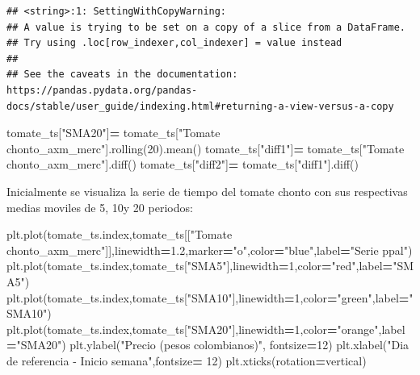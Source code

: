 \documentclass[
]{book}
\newenvironment{Shaded}{\begin{snugshade}}{\end{snugshade}}
\newcommand{\DecValTok}[1]{\textcolor[rgb]{0.00,0.00,0.81}{#1}}
\newcommand{\FloatTok}[1]{\textcolor[rgb]{0.00,0.00,0.81}{#1}}
\newcommand{\NormalTok}[1]{#1}
\newcommand{\OperatorTok}[1]{\textcolor[rgb]{0.81,0.36,0.00}{\textbf{#1}}}
\newcommand{\StringTok}[1]{\textcolor[rgb]{0.31,0.60,0.02}{#1}}
\begin{document}
\begin{verbatim}
## <string>:1: SettingWithCopyWarning: 
## A value is trying to be set on a copy of a slice from a DataFrame.
## Try using .loc[row_indexer,col_indexer] = value instead
## 
## See the caveats in the documentation: https://pandas.pydata.org/pandas-docs/stable/user_guide/indexing.html#returning-a-view-versus-a-copy
\end{verbatim}

\begin{Shaded}
\begin{Highlighting}[]
\NormalTok{tomate\_ts[}\StringTok{"SMA20"}\NormalTok{]}\OperatorTok{=}\NormalTok{ tomate\_ts[}\StringTok{"Tomate chonto\_axm\_merc"}\NormalTok{].rolling(}\DecValTok{20}\NormalTok{).mean()}
\NormalTok{tomate\_ts[}\StringTok{"diff1"}\NormalTok{]}\OperatorTok{=}\NormalTok{ tomate\_ts[}\StringTok{"Tomate chonto\_axm\_merc"}\NormalTok{].diff()}
\NormalTok{tomate\_ts[}\StringTok{"diff2"}\NormalTok{]}\OperatorTok{=}\NormalTok{ tomate\_ts[}\StringTok{"diff1"}\NormalTok{].diff()}
\end{Highlighting}
\end{Shaded}

Inicialmente se visualiza la serie de tiempo del tomate chonto con sus respectivas medias moviles de 5, 10y 20 periodos:

\begin{Shaded}
\begin{Highlighting}[]

\NormalTok{plt.plot(tomate\_ts.index,tomate\_ts[[}\StringTok{"Tomate chonto\_axm\_merc"}\NormalTok{]],linewidth}\OperatorTok{=}\FloatTok{1.2}\NormalTok{,marker}\OperatorTok{=}\StringTok{"o"}\NormalTok{,color}\OperatorTok{=}\StringTok{"blue"}\NormalTok{,label}\OperatorTok{=}\StringTok{"Serie ppal"}\NormalTok{)}
\NormalTok{plt.plot(tomate\_ts.index,tomate\_ts[}\StringTok{"SMA5"}\NormalTok{],linewidth}\OperatorTok{=}\DecValTok{1}\NormalTok{,color}\OperatorTok{=}\StringTok{"red"}\NormalTok{,label}\OperatorTok{=}\StringTok{"SMA5"}\NormalTok{)}
\NormalTok{plt.plot(tomate\_ts.index,tomate\_ts[}\StringTok{"SMA10"}\NormalTok{],linewidth}\OperatorTok{=}\DecValTok{1}\NormalTok{,color}\OperatorTok{=}\StringTok{"green"}\NormalTok{,label}\OperatorTok{=}\StringTok{"SMA10"}\NormalTok{)}
\NormalTok{plt.plot(tomate\_ts.index,tomate\_ts[}\StringTok{"SMA20"}\NormalTok{],linewidth}\OperatorTok{=}\DecValTok{1}\NormalTok{,color}\OperatorTok{=}\StringTok{"orange"}\NormalTok{,label}\OperatorTok{=}\StringTok{"SMA20"}\NormalTok{)}
\NormalTok{plt.ylabel(}\StringTok{"Precio (pesos colombianos)"}\NormalTok{, fontsize}\OperatorTok{=}\DecValTok{12}\NormalTok{)}
\NormalTok{plt.xlabel(}\StringTok{"Dia de referencia {-} Inicio semana"}\NormalTok{,fontsize}\OperatorTok{=} \DecValTok{12}\NormalTok{)}
\NormalTok{plt.xticks(rotation}\OperatorTok{=}\StringTok{\textquotesingle{}vertical\textquotesingle{}}\NormalTok{)}
\end{Highlighting}
\end{Shaded}
\end{document}
